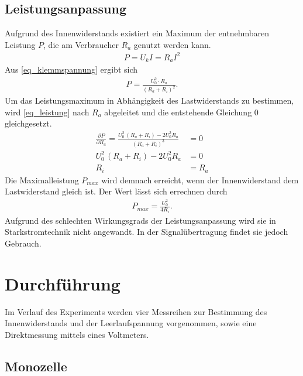\subsection{Leistungsanpassung}
Aufgrund des Innenwiderstands existiert ein Maximum der entnehmbaren Leistung $P$, die am Verbraucher $R_a$ genutzt werden kann.
\begin{align}
 P = U_k I = R_a I^2
\end{align}
Aus \eqref{eq_klemmspannung} ergibt sich
\begin{align}
 P = \frac{U^2_0\cdot R_a}{(R_a+R_i)^2}.
 \label{eq_leistung}
\end{align}
Um das Leistungsmaximum in Abhängigkeit des Lastwiderstands zu bestimmen, wird \eqref{eq_leistung} nach $R_a$ abgeleitet und die 
entstehende Gleichung 0 gleichgesetzt.
\begin{align}
 \nonumber
 \frac{\partial P}{\partial R_a} = \frac{U^2_0\,(R_a+R_i)-2U^2_0R_a}{(R_a+R_i)^3}&=0\\
 \nonumber
 U^2_0\,(R_a+R_i)-2U^2_0R_a&=0\\
 R_i &= R_a
\end{align}
Die Maximalleistung $P_{max}$ wird demnach erreicht, wenn der Innenwiderstand dem Lastwiderstand gleich ist. Der Wert lässt sich errechnen
durch 
\begin{align}
 P_{max} = \frac{U^2_0}{4R_i}.
 \label{eq_maxleistung}
\end{align}
Aufgrund des schlechten Wirkungsgrads der Leistungsanpassung wird sie in Starkstromtechnik nicht angewandt. In der Signalübertragung
findet sie jedoch Gebrauch.

\section{Durchführung}
Im Verlauf des Experiments werden vier Messreihen zur Bestimmung des Innenwiderstands und der Leerlaufspannung vorgenommen, sowie eine
Direktmessung mittels eines Voltmeters.
\subsection{Monozelle}
